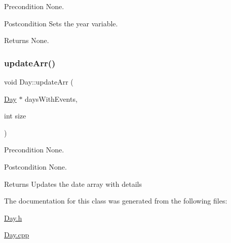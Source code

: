 \begin{DoxyPrecond}{Precondition}
None. 
\end{DoxyPrecond}
\begin{DoxyPostcond}{Postcondition}
Sets the year variable. 
\end{DoxyPostcond}
\begin{DoxyReturn}{Returns}
None. 
\end{DoxyReturn}
\hypertarget{class_day_afb73606e2cd648edcc8256a8d76a3dbb}{}\label{class_day_afb73606e2cd648edcc8256a8d76a3dbb} 
\subsubsection{\texorpdfstring{update\+Arr()}{updateArr()}}
{\footnotesize\ttfamily void Day\+::update\+Arr (\begin{DoxyParamCaption}\item[{\hyperlink{class_day}{Day} $\ast$}]{days\+With\+Events,  }\item[{int}]{size }\end{DoxyParamCaption})}

\begin{DoxyPrecond}{Precondition}
None. 
\end{DoxyPrecond}
\begin{DoxyPostcond}{Postcondition}
None. 
\end{DoxyPostcond}
\begin{DoxyReturn}{Returns}
Updates the date array with details 
\end{DoxyReturn}


The documentation for this class was generated from the following files\+:\begin{DoxyCompactItemize}
\item 
\hyperlink{_day_8h}{Day.\+h}\item 
\hyperlink{_day_8cpp}{Day.\+cpp}\end{DoxyCompactItemize}
